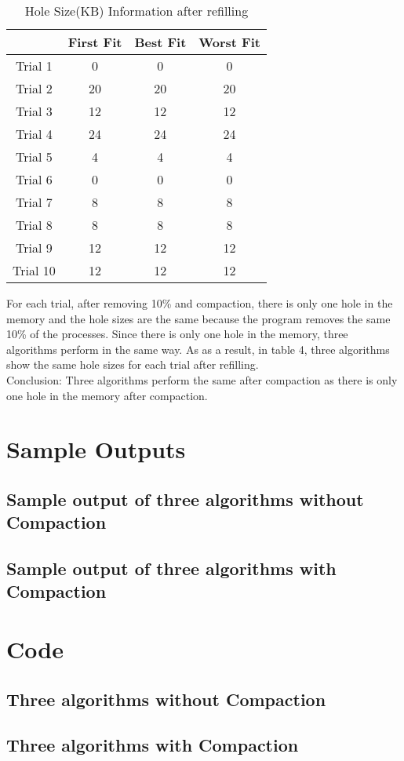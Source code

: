 \documentclass[12pt]{article}
\begin{document}
\begin{table}[h!]
\centering
\begin{tabular}{|c|c|c|c|}
\hline
         & First Fit & Best Fit & Worst Fit \\ \hline
Trial 1  & 0        & 0       & 0        \\ \hline
Trial 2  & 20       & 20      & 20       \\ \hline
Trial 3  & 12       & 12      & 12       \\ \hline
Trial 4  & 24       & 24      & 24       \\ \hline
Trial 5  & 4       & 4      & 4       \\ \hline
Trial 6  & 0        & 0       & 0        \\ \hline
Trial 7  & 8       & 8      & 8       \\ \hline
Trial 8  & 8       & 8      & 8       \\ \hline
Trial 9  & 12       & 12      & 12       \\ \hline
Trial 10 & 12        & 12       & 12        \\ \hline
\end{tabular}
\caption{Hole Size(KB) Information after refilling}
\end{table}
\noindent For each trial, after removing 10\% and compaction, there is only
one hole in the memory and the hole sizes are the same because the program
removes the same 10\% of the processes. Since there is only one hole in the 
memory, three algorithms perform in the same way. As as a result, in table 4,
three algorithms show the same hole sizes for each trial after refilling.\\
Conclusion: Three algorithms perform the same after compaction as there is
only one hole in the memory after compaction.
\newpage
\section{Sample Outputs}
\small
\subsection{Sample output of three algorithms without Compaction}

\newpage
\subsection{Sample output of three algorithms with Compaction}

\newpage
\scriptsize
\section{Code}
\subsection{Three algorithms without Compaction}

\newpage
\subsection{Three algorithms with Compaction}

\end{document}
